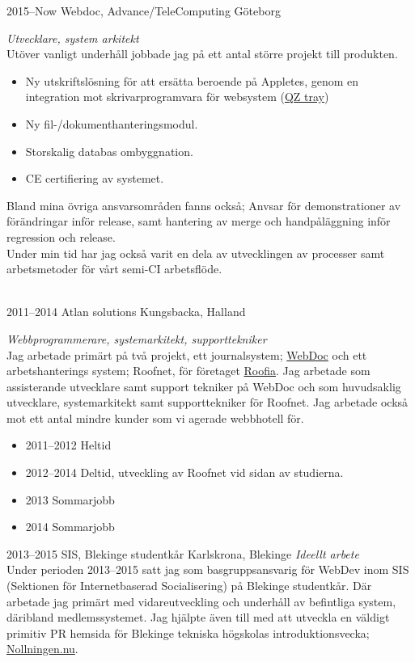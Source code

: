 \documentclass[]{friggeri-cv} %
\begin{document}
\begin{entrylist}
\entry
{2015--Now}
{Webdoc, Advance/TeleComputing}
{Göteborg}
{\emph{Utvecklare, system arkitekt} \\
Utöver vanligt underhåll jobbade jag på ett antal större projekt till produkten.
\begin{itemize}
\item Ny utskriftslösning för att ersätta beroende på Appletes, genom en integration mot skrivarprogramvara för websystem (\href{http://qz.io}{QZ tray})
\item Ny fil-/dokumenthanteringsmodul.
\item Storskalig databas ombyggnation.
\item CE certifiering av systemet.
\end{itemize}
Bland mina övriga ansvarsområden fanns också; Anvsar för demonstrationer av förändringar inför release, samt hantering av merge och handpåläggning inför regression och release. \\
Under min tid har jag också varit en dela av utvecklingen av processer samt arbetsmetoder för vårt semi-CI arbetsflöde.\\

}\\
\entry
{2011--2014}
{Atlan solutions}
{Kungsbacka, Halland}
{\emph{Webbprogrammerare, systemarkitekt, supporttekniker} \\
Jag arbetade primärt på två projekt, ett journalsystem; \href{http://atlan.se/}{WebDoc} och ett arbetshanterings system; Roofnet, för företaget \href{http://www.roofia.se/}{Roofia}. Jag arbetade som assisterande utvecklare samt support tekniker på WebDoc och som huvudsaklig utvecklare, systemarkitekt samt supporttekniker för Roofnet. Jag arbetade också mot ett antal mindre kunder som vi agerade webbhotell för. \\
\begin{itemize}
	\item 2011--2012 Heltid
	\item 2012--2014 Deltid, utveckling av Roofnet vid sidan av studierna.
	\item 2013 Sommarjobb
	\item 2014 Sommarjobb
\end{itemize}
}
\entry
{2013--2015}
{SIS, Blekinge studentkår}
{Karlskrona, Blekinge}
{\emph{Ideellt arbete} \\
Under perioden 2013--2015 satt jag som basgruppsansvarig för WebDev inom SIS (Sektionen för Internetbaserad Socialisering) på Blekinge studentkår. Där arbetade jag primärt med vidareutveckling och underhåll av befintliga system, däribland medlemssystemet. Jag hjälpte även till med att utveckla en väldigt primitiv PR hemsida för Blekinge tekniska högskolas introduktionsvecka; \href{http://www.nollningen.nu}{Nollningen.nu}. }
\end{entrylist}
\newpage
\end{document}
